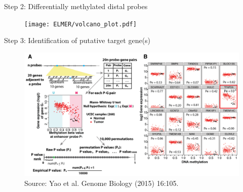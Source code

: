 \documentclass[slidestop,compress,11pt,xcolor=dvipsnames]{beamer}
\begin{document}

\begin{frame}{Step 2: Differentially methylated distal probes}
 \begin{figure}
  \centering
  \texttt{[image: ELMER/volcano\_plot.pdf]}
 \end{figure}
\end{frame}

\begin{frame}{Step 3: Identification of putative target gene(s)}
 \vspace*{-0.4cm}
 \begin{figure}
\hspace*{-0.5cm}
\includegraphics[width=1.1\linewidth]{ELMER/pair.png}{\tiny{\\\vspace{-0.3cm}Source: Yao et al. Genome Biology (2015) 16:105.}}
 \end{figure}
\end{frame}



\end{document}
